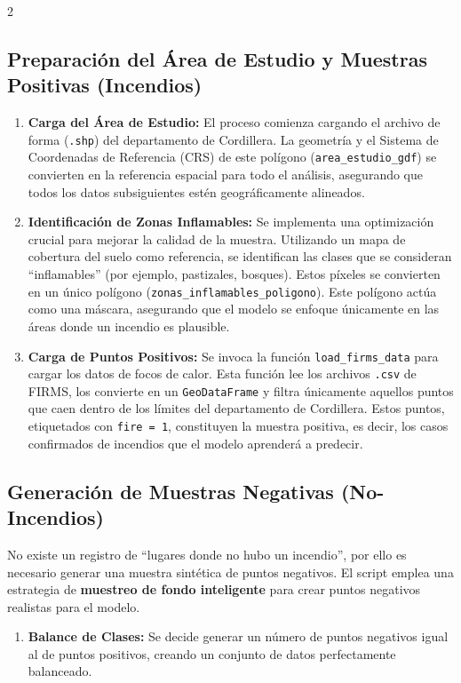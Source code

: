 \documentclass[a4paper,10pt]{article}
\begin{document}
\begin{multicols}{2}
\subsection{Preparación del Área de Estudio y Muestras Positivas (Incendios)}

\begin{enumerate}
    \item \textbf{Carga del Área de Estudio:} El proceso comienza cargando el archivo de forma (\texttt{.shp}) del departamento de Cordillera. La geometría y el Sistema de Coordenadas de Referencia (CRS) de este polígono (\texttt{area\_estudio\_gdf}) se convierten en la referencia espacial para todo el análisis, asegurando que todos los datos subsiguientes estén geográficamente alineados.

    \item \textbf{Identificación de Zonas Inflamables:} Se implementa una optimización crucial para mejorar la calidad de la muestra. Utilizando un mapa de cobertura del suelo como referencia, se identifican las clases que se consideran ``inflamables'' (por ejemplo, pastizales, bosques). Estos píxeles se convierten en un único polígono (\texttt{zonas\_inflamables\_poligono}). Este polígono actúa como una máscara, asegurando que el modelo se enfoque únicamente en las áreas donde un incendio es plausible.

    \item \textbf{Carga de Puntos Positivos:} Se invoca la función \texttt{load\_firms\_data} para cargar los datos de focos de calor. Esta función lee los archivos \texttt{.csv} de FIRMS, los convierte en un \texttt{GeoDataFrame} y filtra únicamente aquellos puntos que caen dentro de los límites del departamento de Cordillera. Estos puntos, etiquetados con \texttt{fire = 1}, constituyen la muestra positiva, es decir, los casos confirmados de incendios que el modelo aprenderá a predecir.
\end{enumerate}

\subsection{Generación de Muestras Negativas (No-Incendios)}

No existe un registro de ``lugares donde no hubo un incendio'', por ello es necesario generar una muestra sintética de puntos negativos. El script emplea una estrategia de \textbf{muestreo de fondo inteligente} para crear puntos negativos realistas para el modelo.

\begin{enumerate}
    \item \textbf{Balance de Clases:} Se decide generar un número de puntos negativos igual al de puntos positivos, creando un conjunto de datos perfectamente balanceado.


\end{enumerate}
\end{multicols}
\end{document}
